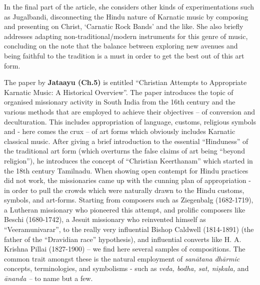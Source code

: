 In the final part of the article, she considers other kinds of experimentations such as Jugalbandi, disconnecting the Hindu nature of Karnatic music by composing and presenting on Christ, ‘Carnatic Rock Bands’ and the like. She also briefly addresses adapting non-traditional/modern instruments for this genre of music, concluding on the note that the balance between exploring new avenues and being faithful to the tradition is a must in order to get the best out of this art form.

The paper by \textbf{Jataayu (Ch.5)} is entitled “Christian Attempts to Appropriate Karnatic Music: A Historical Overview”. The paper introduces the topic of organised missionary activity in South India from the 16th century and the various methods that are employed to achieve their objectives – of conversion and deculturation. This includes appropriation of language, customs, religious symbols and - here comes the crux – of art forms which obviously includes Karnatic classical music. After giving a brief introduction to the essential “Hinduness” of the traditional art form (which overturns the false claims of art being “beyond religion”), he introduces the concept of “Christian Keerthanam” which started in the 18th century Tamilnadu. When showing open contempt for Hindu practices did not work, the missionaries came up with the cunning plan of appropriation - in order to pull the crowds which were naturally drawn to the Hindu customs, symbols, and art-forms. Starting from composers such as Ziegenbalg (1682-1719), a Lutheran missionary who pioneered this attempt, and prolific composers like Beschi (1680-1742), a Jesuit missionary who reinvented himself as “Veeramunivarar”, to the really very influential Bishop Caldwell (1814-1891) (the father of the “Dravidian race” hypothesis), and influential converts like H. A. Krishna Pillai (1827-1900) – we find here several samples of compositions. The common trait amongst these is the natural employment of \textit{sanātana dhārmic} concepts, terminologies, and symbolisms - such as \textit{veda, bodha, sat, niṣkala,} and \textit{ānanda –} to name but a few.

